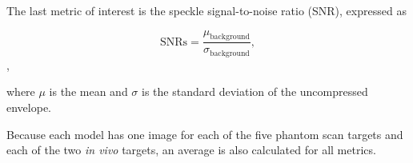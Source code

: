 The last metric of interest is the speckle signal-to-noise ratio (SNR), expressed as


\begin{equation*} \textrm {SNRs} = \frac {\mu _{\text {background}}}{\sigma _{\text {background}}},\tag{5}
\end{equation*},

where $\mu$ is the mean and $\sigma$ is the standard deviation of the uncompressed envelope.

Because each model has one image for each of the five phantom scan targets and each of the two \textit{in vivo} targets, an average is also calculated for all metrics.


%
